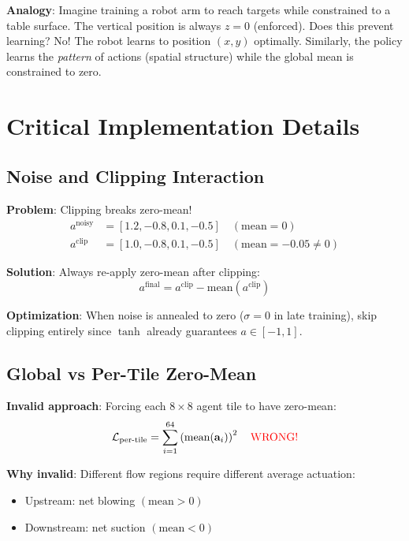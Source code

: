 \documentclass[11pt,a4paper]{article}
\theoremstyle{definition}
\begin{document}
\textbf{Analogy}: Imagine training a robot arm to reach targets while constrained to a table surface. The vertical position is always $z = 0$ (enforced). Does this prevent learning? No! The robot learns to position $(x, y)$ optimally. Similarly, the policy learns the \textit{pattern} of actions (spatial structure) while the global mean is constrained to zero.

\section{Critical Implementation Details}

\subsection{Noise and Clipping Interaction}

\textbf{Problem}: Clipping breaks zero-mean!
\begin{align}
    a^{\text{noisy}} &= [1.2, -0.8, 0.1, -0.5] \quad (\text{mean} = 0) \\
    a^{\text{clip}} &= [1.0, -0.8, 0.1, -0.5] \quad (\text{mean} = -0.05 \neq 0)
\end{align}

\textbf{Solution}: Always re-apply zero-mean after clipping:
\begin{equation}
    a^{\text{final}} = a^{\text{clip}} - \text{mean}(a^{\text{clip}})
\end{equation}

\textbf{Optimization}: When noise is annealed to zero ($\sigma = 0$ in late training), skip clipping entirely since $\tanh$ already guarantees $a \in [-1, 1]$.

\subsection{Global vs Per-Tile Zero-Mean}

\textbf{Invalid approach}: Forcing each $8 \times 8$ agent tile to have zero-mean:
\begin{equation}
    \mathcal{L}_{\text{per-tile}} = \sum_{i=1}^{64} \left(\text{mean}(\mathbf{a}_i)\right)^2 \quad \textcolor{red}{\text{WRONG!}}
\end{equation}

\textbf{Why invalid}: Different flow regions require different average actuation:
\begin{itemize}
    \item Upstream: net blowing $(\text{mean} > 0)$
    \item Downstream: net suction $(\text{mean} < 0)$
\end{itemize}
\end{document}
